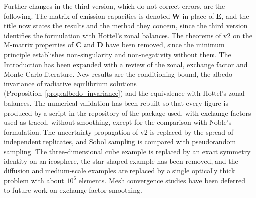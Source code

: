 \documentclass[preprint,1p,times]{elsarticle}
\theoremstyle{plain}
\theoremstyle{definition}
\theoremstyle{remark}
\begin{document}
Further changes in the third version, which do not correct errors, are the following. The matrix of emission capacities is denoted $\mathbf{W}$ in place of $\mathbf{E}$, and the title now states the results and the method they concern, since the third version identifies the formulation with Hottel's zonal balances. The theorems of v2 on the M-matrix properties of $\mathbf{C}$ and $\mathbf{D}$ have been removed, since the minimum principle establishes non-singularity and non-negativity without them. The Introduction has been expanded with a review of the zonal, exchange factor and Monte Carlo literature. New results are the conditioning bound, the albedo invariance of radiative equilibrium solutions (Proposition~\ref{prop:albedo_invariance}) and the equivalence with Hottel's zonal balances. The numerical validation has been rebuilt so that every figure is produced by a script in the repository of the package used, with exchange factors used as traced, without smoothing, except for the comparison with Noble's formulation. The uncertainty propagation of v2 is replaced by the spread of independent replicates, and Sobol sampling is compared with pseudorandom sampling. The three-dimensional cube example is replaced by an exact symmetry identity on an icosphere, the star-shaped example has been removed, and the diffusion and medium-scale examples are replaced by a single optically thick problem with about $10^6$ elements. Mesh convergence studies have been deferred to future work on exchange factor smoothing.
\end{document}
